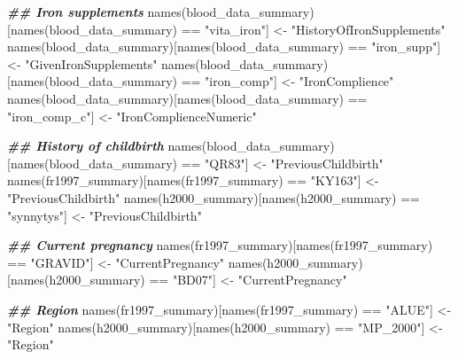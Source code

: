 \documentclass[
]{article}
\newenvironment{Shaded}{\begin{snugshade}}{\end{snugshade}}
\newcommand{\DocumentationTok}[1]{\textcolor[rgb]{0.56,0.35,0.01}{\textbf{\textit{#1}}}}
\newcommand{\FunctionTok}[1]{\textcolor[rgb]{0.00,0.00,0.00}{#1}}
\newcommand{\NormalTok}[1]{#1}
\newcommand{\OtherTok}[1]{\textcolor[rgb]{0.56,0.35,0.01}{#1}}
\newcommand{\SpecialCharTok}[1]{\textcolor[rgb]{0.00,0.00,0.00}{#1}}
\newcommand{\StringTok}[1]{\textcolor[rgb]{0.31,0.60,0.02}{#1}}
\begin{document}
\begin{Shaded}
\begin{Highlighting}[]
\DocumentationTok{\#\# Iron supplements}
\FunctionTok{names}\NormalTok{(blood\_data\_summary)[}\FunctionTok{names}\NormalTok{(blood\_data\_summary) }\SpecialCharTok{==} \StringTok{"vita\_iron"}\NormalTok{] }\OtherTok{\textless{}{-}} \StringTok{"HistoryOfIronSupplements"}
\FunctionTok{names}\NormalTok{(blood\_data\_summary)[}\FunctionTok{names}\NormalTok{(blood\_data\_summary) }\SpecialCharTok{==} \StringTok{"iron\_supp"}\NormalTok{] }\OtherTok{\textless{}{-}} \StringTok{"GivenIronSupplements"}
\FunctionTok{names}\NormalTok{(blood\_data\_summary)[}\FunctionTok{names}\NormalTok{(blood\_data\_summary) }\SpecialCharTok{==} \StringTok{"iron\_comp"}\NormalTok{] }\OtherTok{\textless{}{-}} \StringTok{"IronComplience"}
\FunctionTok{names}\NormalTok{(blood\_data\_summary)[}\FunctionTok{names}\NormalTok{(blood\_data\_summary) }\SpecialCharTok{==} \StringTok{"iron\_comp\_c"}\NormalTok{] }\OtherTok{\textless{}{-}} \StringTok{"IronComplienceNumeric"}

\DocumentationTok{\#\# History of childbirth}
\FunctionTok{names}\NormalTok{(blood\_data\_summary)[}\FunctionTok{names}\NormalTok{(blood\_data\_summary) }\SpecialCharTok{==} \StringTok{"QR83"}\NormalTok{] }\OtherTok{\textless{}{-}} \StringTok{"PreviousChildbirth"}
\FunctionTok{names}\NormalTok{(fr1997\_summary)[}\FunctionTok{names}\NormalTok{(fr1997\_summary) }\SpecialCharTok{==} \StringTok{"KY163"}\NormalTok{] }\OtherTok{\textless{}{-}} \StringTok{"PreviousChildbirth"}
\FunctionTok{names}\NormalTok{(h2000\_summary)[}\FunctionTok{names}\NormalTok{(h2000\_summary) }\SpecialCharTok{==} \StringTok{"synnytys"}\NormalTok{] }\OtherTok{\textless{}{-}} \StringTok{"PreviousChildbirth"}

\DocumentationTok{\#\# Current pregnancy}
\FunctionTok{names}\NormalTok{(fr1997\_summary)[}\FunctionTok{names}\NormalTok{(fr1997\_summary) }\SpecialCharTok{==} \StringTok{"GRAVID"}\NormalTok{] }\OtherTok{\textless{}{-}} \StringTok{"CurrentPregnancy"}
\FunctionTok{names}\NormalTok{(h2000\_summary)[}\FunctionTok{names}\NormalTok{(h2000\_summary) }\SpecialCharTok{==} \StringTok{"BD07"}\NormalTok{] }\OtherTok{\textless{}{-}} \StringTok{"CurrentPregnancy"}

\DocumentationTok{\#\# Region}
\FunctionTok{names}\NormalTok{(fr1997\_summary)[}\FunctionTok{names}\NormalTok{(fr1997\_summary) }\SpecialCharTok{==} \StringTok{"ALUE"}\NormalTok{] }\OtherTok{\textless{}{-}} \StringTok{"Region"}
\FunctionTok{names}\NormalTok{(h2000\_summary)[}\FunctionTok{names}\NormalTok{(h2000\_summary) }\SpecialCharTok{==} \StringTok{"MP\_2000"}\NormalTok{] }\OtherTok{\textless{}{-}} \StringTok{"Region"}


\end{Highlighting}
\end{Shaded}
\end{document}
